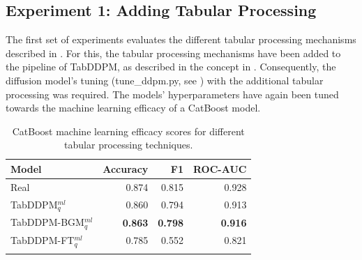 \subsection{Experiment 1: Adding Tabular Processing}
\label{ch:Experiment-1}

The first set of experiments evaluates the different tabular processing mechanisms described in .
For this, the tabular processing mechanisms have been added to the pipeline of TabDDPM, as described in the concept in .
Consequently, the diffusion \gls{model}'s tuning (tune\_ddpm.py, see ) with the additional tabular processing was required.
The models' hyperparameters have again been tuned towards the machine learning efficacy of a CatBoost \gls{model}.

\begin{table}[h]
	\centering
	\begin{tabular}{lrrr}
		\toprule
		\textbf{Model}         & \textbf{Accuracy} & \textbf{F1}    & \textbf{ROC-AUC} \\
		\midrule
		Real                   & 0.874              & 0.815          & 0.928            \\
		TabDDPM$^{ml}_{q}$     & 0.860              & 0.794          & 0.913            \\
		TabDDPM-BGM$^{ml}_{q}$ & \textbf{0.863}     & \textbf{0.798} & \textbf{0.916}   \\
		TabDDPM-FT$^{ml}_{q}$  & 0.785              & 0.552          & 0.821            \\
		\bottomrule
		\multicolumn{4}{c}{}\\[-0.6em]
	\end{tabular}
	\caption[Experiment 1 ML efficacy]{CatBoost machine learning efficacy scores for different tabular processing techniques.}
	\label{tab:exp1-ml}
\end{table}


